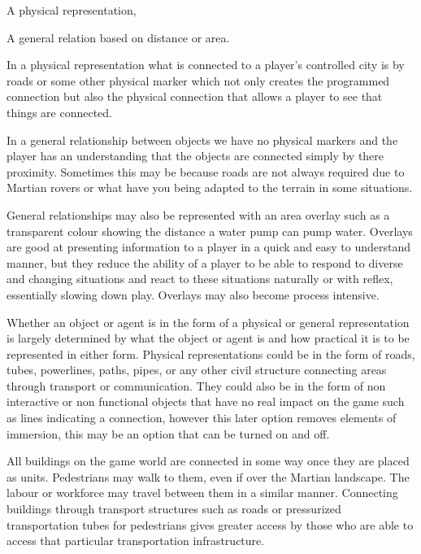 \startitemize[4]
        \item A physical representation,
        \item A general relation based on distance or area.
\stopitemize

In a physical representation what is connected to a player's controlled city is by roads or some other physical marker which not only creates the programmed connection but also the physical connection that allows a player to see that things are connected.

In a general relationship between objects we have no physical markers and the player has an understanding that the objects are connected simply by there proximity. Sometimes this may be because roads are not always required due to Martian rovers or what have you being adapted to the terrain in some situations. 

General relationships may also be represented with an area overlay such as a transparent colour showing the distance a water pump can pump water. Overlays are good at presenting information to a player in a quick and easy to understand manner, but they reduce the ability of a player to be able to respond to diverse and changing situations and react to these situations naturally or with reflex, essentially slowing down play. Overlays may also become process intensive. 
  
Whether an object or agent is in the form of a physical or general representation is largely determined by what the object or agent is and how practical it is to be represented in either form. Physical representations could be in the form of roads, tubes, powerlines, paths, pipes, or any other civil structure connecting areas through transport or communication. They could also be in the form of non interactive or non functional objects that have no real impact on the game such as lines indicating a connection, however this later option removes elements of immersion, this may be an option that can be turned on and off.


All buildings on the game world are connected in some way once they are placed as units. Pedestrians may walk to them, even if over the Martian landscape. The labour or workforce may travel between them in a similar manner. Connecting buildings through transport structures such as roads or pressurized transportation tubes for pedestrians gives greater access by those who are able to access that particular transportation infrastructure. 

